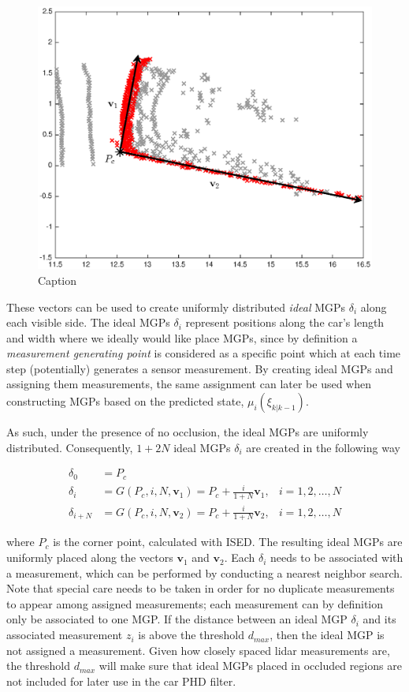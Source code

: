 \begin{figure}[ht]
    \centering
    \includegraphics[width = 0.5\linewidth]{include/images/vectors.eps}
    \caption{Caption}
    \label{fig:vectors}
\end{figure}

These vectors can be used to create uniformly distributed \emph{ideal} MGPs $\delta_i$ along each visible side. The ideal MGPs $\delta_i$ represent positions along the car's length and width where we ideally would like place MGPs, since by definition a \emph{measurement generating point} is considered as a specific point which at each time step (potentially) generates a sensor measurement. By creating ideal MGPs and assigning them measurements, the same assignment can later be used when constructing MGPs based on the predicted state, $\mu_i(\xi_{k|k-1})$.

As such, under the presence of no occlusion, the ideal MGPs are uniformly distributed. Consequently, $1 + 2N$ ideal MGPs $\delta_i$ are created in the following way

\begin{align}
    \delta_0 &= P_c 
    \nonumber\\
    \delta_i &= G(P_c, i, N, \mathbf{v}_1) = P_c + \frac{i}{1+N}\mathbf{v}_1, & i = 1,2,\dots,N \\
    \delta_{i+N} &= G(P_c, i, N, \mathbf{v}_2) = P_c + \frac{i}{1+N}\mathbf{v}_2, & i = 1,2,\dots,N 
    \nonumber
\end{align}

where $P_c$ is the corner point, calculated with ISED. The resulting ideal MGPs are uniformly placed along the vectors $\mathbf{v}_1$ and $\mathbf{v}_2$. Each $\delta_i$ needs to be associated with a measurement, which can be performed by conducting a nearest neighbor search. Note that special care needs to be taken in order for no duplicate measurements to appear among assigned measurements; each measurement can by definition only be associated to one MGP. If the distance between an ideal MGP $\delta_i$ and its associated measurement $z_i$ is above the threshold $d_{max}$, then the ideal MGP is not assigned a measurement. Given how closely spaced lidar measurements are, the threshold $d_{max}$ will make sure that ideal MGPs placed in occluded regions are not included for later use in the car PHD filter. 

